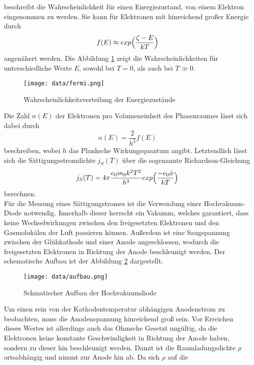 beschreibt die Wahrscheinlichkeit für einen Energiezustand, von einem Elektron eingenommen zu werden. 
Sie kann für Elektronen mit hinreichend großer Energie durch 
\begin{equation}
    f(E) \approx exp \Bigl(\frac{\zeta-E}{kT}\Bigr)
\end{equation} angenähert werden. Die Abbildung \ref{fig:fermi} zeigt die Wahrscheinlichkeiten für unterschiedliche Werte $E$, sowohl bei 
$T=0$, als auch bei $T \gg 0$.
\begin{figure}
    \centering
    \texttt{[image: data/fermi.png]}
    \caption{Wahrscheinlichkeitsverteilung der Energiezustände}
    \label{fig:fermi}
\end{figure}
\FloatBarrier
Die Zahl $n(E)$ der Elektronen pro Volumeneinheit des Phasenraumes lässt sich dabei durch 
\begin{equation}
    n(E) = \frac{2}{h^3} f(E)
\end{equation}  
beschreiben, wobei $h$ das Planksche Wirkungsquantum angibt. Letztendlich lässt sich die Sättigungsstromdichte $j_S(T)$ über die sogenannte
Richardson-Gleichung 
\begin{equation}
    j_S(T) = 4\pi \frac{e_0 m_0 k^2 T^2}{h^3} exp\Bigl(\frac{-e_0 \phi}{kT}\Bigr)
    \label{eqn:richard}
\end{equation}
berechnen. 
\\
Für die Messung eines Sättigungstromes ist die Verwendung einer Hochvakuum-Diode notwendig. Innerhalb dieser herrscht ein Vakumm, welches 
garantiert, dass keine Wechselwirkungen zwischen den freigesetzten Elektronen und den Gasmolukälen der Luft passieren können. Außerdem ist 
eine Saugspannung zwischen der Glühkathode und einer Anode angeschlossen, wodurch die freigesetzten Elektronen in Richtung der Anode beschleunigt
werden. Der schematische Aufbau ist der Abbildung \ref{fig:diode} dargestellt.
\begin{figure}
    \centering
    \texttt{[image: data/aufbau.png]}
    \caption{Schmatischer Aufbau der Hochvakuumdiode}
    \label{fig:diode}
\end{figure}
\FloatBarrier
Um einen rein von der Kathodentemperatur abhängigen Anodenstrom zu beobachten, muss die Anodenspannung hinreichend groß sein. Vor Erreichen dieses 
Wertes ist allerdings auch das Ohmsche Gesetzt ungültig, da die Elektronen keine konstante Geschwindigkeit in Richtung der Anode haben, sondern 
zu dieser hin beschleunigt werden. Damit ist die Raumladungsdichte $\rho$ ortsabhängig und nimmt zur Anode hin ab. Da sich $\rho$ auf die 
